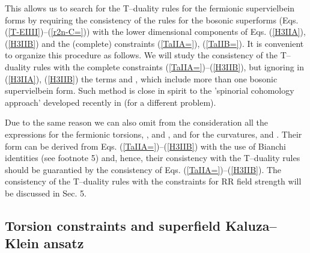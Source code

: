 \documentclass[a4paper,11pt]{article}
\begin{document}
This allows us to search for the T--duality rules for the fermionic 
supervielbein forms by requiring the consistency of the rules for the bosonic 
superforms (Eqs. (\ref{T-EIIII})--(\ref{r2n-C=})) 
with the 
lower dimensional components of Eqs. (\ref{H3IIA}), (\ref{H3IIB}) and 
the (complete) constraints (\ref{TaIIA=}),  (\ref{TaIIB=}). 
It is convenient to organize this procedure as follows. 
We will study the consistency of the T--duality rules with the complete 
constraints (\ref{TaIIA=})--(\ref{H3IIB}), 
but ignoring in (\ref{H3IIA}), (\ref{H3IIB}) the terms 
\coordHE{} and \coordHE{}, which include more than 
one bosonic supervielbein form. 
Such method is close in spirit to the 
'spinorial cohomology approach' developed recently in \cite{NC} (for 
 a different problem).  


Due to the same reason we can also omit from the consideration all the 
expressions for the fermionic torsions, 
\coordHE{}, \coordHE{} and 
\coordHE{}, and for the curvatures,  
\coordHE{} 
and  \coordHE{}.  
Their form can be derived from Eqs. (\ref{TaIIA=})--(\ref{H3IIB}) 
with the use of Bianchi identities (see footnote 5) 
and, hence, their consistency with the 
T--duality rules should be guarantied by the consistency of 
Eqs. (\ref{TaIIA=})--(\ref{H3IIB}). 
The consistency of the T--duality rules with the constraints for 
RR field strength will be discussed in Sec. 5.  

\subsection{Torsion constraints and superfield Kaluza--Klein ansatz} 
\end{document}
